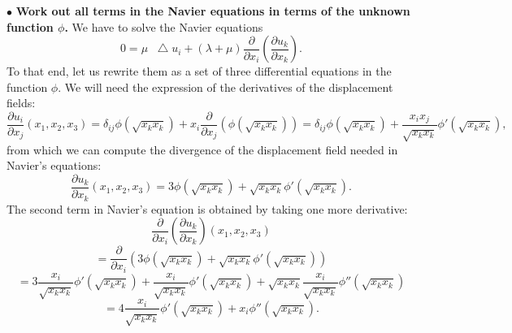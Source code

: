 \documentclass[DIV=12]{article}
\newcommand*\Laplace{\mathop{}\!\mathbin\bigtriangleup}
\begin{document}
$\bullet$ {\bf{Work out all terms in the Navier equations in terms of the unknown function $\phi$.}} We have to solve the Navier equations
\begin{equation}
0 = \mu \Laplace u_i + (\lambda+ \mu) \frac{\partial}{\partial x_i}\left( \frac{\partial u_k}{\partial x_k} \right).
\end{equation}
 To that end, let us rewrite them as a set of three differential equations in the function $\phi$. We will 
 need the expression of the derivatives of the displacement fields:
\begin{equation}
 \frac{\partial u_i}{\partial x_j} ( x_1,x_2, x_3 ) = \delta_{ij} \phi(\sqrt{x_k x_k}  )  + x_i \frac{\partial }{\partial x_j}(  \phi( \sqrt{x_k x_k} ) ) 
=  \delta_{ij} \phi( \sqrt{x_k x_k}  )  + \frac{x_i x_j}{ \sqrt{x_k x_k} } \phi'( \sqrt{x_k x_k} ),
\label{derivative}
\end{equation}
 from which we can compute the divergence of the displacement field needed in Navier's equations:
\begin{equation}
\frac{\partial u_k}{\partial x_k}  ( x_1,x_2, x_3 ) = 3\phi(  \sqrt{x_k x_k}) + \sqrt{x_k x_k} \phi'( \sqrt{x_k x_k}).
\end{equation}
 The second term in Navier's equation is obtained by taking one more derivative:
\begin{equation}
\frac{\partial}{\partial x_i}\left(\frac{\partial u_k}{\partial x_k}  \right)( x_1,x_2, x_3 )
\end{equation}
\begin{equation}
= \frac{\partial}{\partial x_i} \left(3\phi(  \sqrt{x_k x_k}) + \sqrt{x_k x_k} \phi'( \sqrt{x_k x_k})\right) 
\end{equation}
\begin{equation}
= 3\frac{x_i }{ \sqrt{x_k x_k} } \phi'( \sqrt{x_k x_k} )+ \frac{x_i }{  \sqrt{x_k x_k }}\phi'( \sqrt{x_k x_k}) +  \sqrt{x_k x_k} \frac{x_i}{ \sqrt{x_k x_k }}\phi''( \sqrt{x_k x_k})
\end{equation}
\begin{equation}
= 4\frac{x_i }{ \sqrt{x_k x_k} } \phi'( \sqrt{x_k x_k} ) +  x_i\phi''( \sqrt{x_k x_k}).
\label{divGrad}
\end{equation}
\end{document}
